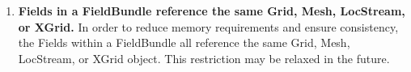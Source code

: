 

\begin{enumerate}

\item{\bf Fields in a FieldBundle reference the same Grid, Mesh, LocStream, or XGrid.}
In order to reduce memory requirements and ensure consistency, the 
Fields within a FieldBundle all reference the same Grid, Mesh, 
LocStream, or XGrid object. This restriction may be relaxed in the future.

\end{enumerate}


